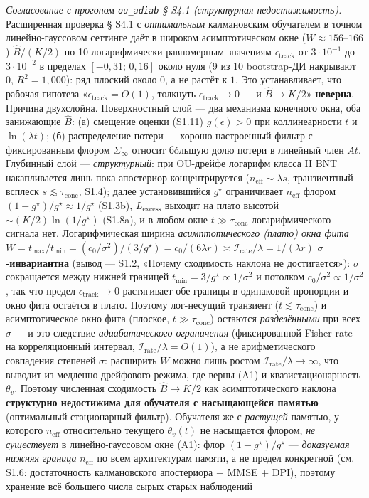 \documentclass[12pt]{iopart}
\begin{document}
\emph{Согласование с прогоном \texttt{ou\_adiab} § S4.1 (структурная недостижимость).} Расширенная проверка § S4.1 с \emph{оптимальным} калмановским обучателем в точном линейно-гауссовом сеттинге даёт в широком асимптотическом окне (\(W \approx 156\)--\(166\)) \(\hat B/(K/2)\) по 10 логарифмически равномерным значениям \(\epsilon_{\text{track}}\) от \(3\cdot10^{-1}\) до \(3\cdot10^{-2}\) в пределах \([-0{,}31;\,0{,}16]\) около нуля (9 из 10 bootstrap-ДИ накрывают \(0\), \(R^2 = 1{,}000\)): ряд плоский около \(0\), а не растёт к \(1\). Это устанавливает, что рабочая гипотеза «\(\epsilon_{\text{track}} = O(1)\), толкнуть \(\epsilon_{\text{track}} \to 0\) --- и \(\hat B \to K/2\)» \textbf{неверна}. Причина двухслойна. Поверхностный слой --- два механизма конечного окна, оба занижающие \(\hat B\): (а) смещение оценки (S1.11) \(g(\epsilon) > 0\) при коллинеарности \(t\) и \(\ln(\lambda t)\); (б) распределение потери --- хорошо настроенный фильтр с фиксированным флором \(\Sigma_\infty\) относит бóльшую долю потери в линейный член \(A t\). Глубинный слой --- \emph{структурный}: при OU-дрейфе логарифм класса II BNT \cite{BialekNemenmanTishby2001} накапливается лишь пока апостериор концентрируется (\(n_{\text{eff}} \sim \lambda s\), транзиентный всплеск \(s \lesssim \tau_{\text{conc}}\), S1.4); далее установившийся \(g^\star\) ограничивает \(n_{\text{eff}}\) флором \((1-g^\star)/g^\star \approx 1/g^\star\) (S1.3b), \(L_{\text{excess}}\) выходит на плато высотой \(\sim (K/2)\ln(1/g^\star)\) (S1.8a), и в любом окне \(t \gg \tau_{\text{conc}}\) логарифмического сигнала нет. Логарифмическая ширина \emph{асимптотического (плато) окна фита} \(W = t_{\max}/t_{\min} = (c_0/\sigma^2)/(3/g^\star) = c_0/(6\lambda r) \asymp \mathcal I_{\text{rate}}/\lambda = 1/(\lambda r)\) \textbf{\(\sigma\)-инвариантна} (вывод --- S1.2, «Почему сходимость наклона не достигается»): \(\sigma\) сокращается между нижней границей \(t_{\min} = 3/g^\star \propto 1/\sigma^2\) и потолком \(c_0/\sigma^2 \propto 1/\sigma^2\), так что предел \(\epsilon_{\text{track}} \to 0\) растягивает обе границы в одинаковой пропорции и окно фита остаётся в плато. Поэтому лог-несущий транзиент (\(t \lesssim \tau_{\text{conc}}\)) и асимптотическое окно фита (плоское, \(t \gg \tau_{\text{conc}}\)) остаются \emph{разделёнными} при всех \(\sigma\) --- и это следствие \emph{адиабатического ограничения} (фиксированной Fisher-rate на корреляционный интервал, \(\mathcal I_{\text{rate}}/\lambda = O(1)\)), а не арифметического совпадения степеней \(\sigma\): расширить \(W\) можно лишь ростом \(\mathcal I_{\text{rate}}/\lambda \to \infty\), что выводит из медленно-дрейфового режима, где верны (A1) и квазистационарность \(\theta_v\). Поэтому численная сходимость \(\hat B \to K/2\) как асимптотического наклона \textbf{структурно недостижима для обучателя с насыщающейся памятью} (оптимальный стационарный фильтр). Обучателя же с \emph{растущей} памятью, у которого \(n_{\text{eff}}\) относительно текущего \(\theta_v(t)\) не насыщается флором, \emph{не существует} в линейно-гауссовом окне (A1): флор \((1-g^\star)/g^\star\) --- \emph{доказуемая нижняя граница} \(n_{\text{eff}}\) по всем архитектурам памяти, а не предел конкретной (см. S1.6: достаточность калмановского апостериора + MMSE + DPI), поэтому хранение всё большего числа сырых старых наблюдений 
\end{document}
